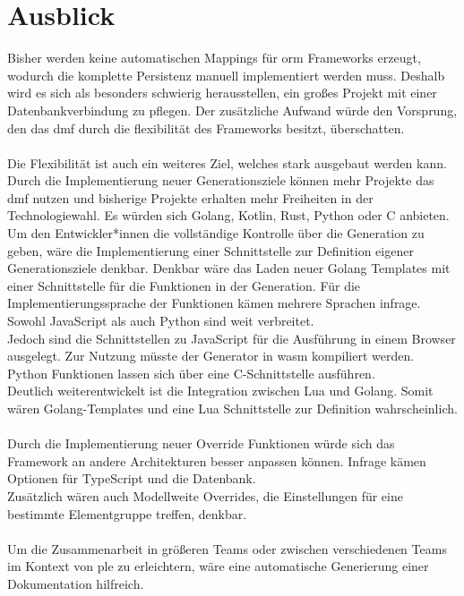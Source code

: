 \documentclass[./einleitung.tex]{subfiles}
\begin{document}
\section{Ausblick}\label{sec:ausblick}
Bisher werden keine automatischen Mappings für \acrshort{orm} Frameworks erzeugt, wodurch die komplette Persistenz manuell implementiert werden muss.
    Deshalb wird es sich als besonders schwierig herausstellen, ein großes Projekt mit einer Datenbankverbindung zu pflegen.
    Der zusätzliche Aufwand würde den Vorsprung, den das \acrshort{dmf} durch die flexibilität des Frameworks besitzt, überschatten.
    \\\\
    Die Flexibilität ist auch ein weiteres Ziel, welches stark ausgebaut werden kann.
    Durch die Implementierung neuer Generationsziele können mehr Projekte das \acrshort{dmf} nutzen und bisherige Projekte erhalten mehr Freiheiten in der Technologiewahl.
    Es würden sich Golang, Kotlin, Rust, Python oder C anbieten.\\
    Um den Entwickler*innen die vollständige Kontrolle über die Generation zu geben, wäre die Implementierung einer Schnittstelle zur Definition eigener Generationsziele denkbar.
    Denkbar wäre das Laden neuer Golang Templates mit einer Schnittstelle für die Funktionen in der Generation.
    Für die Implementierungssprache der Funktionen kämen mehrere Sprachen infrage.
    Sowohl JavaScript als auch Python sind weit verbreitet.\\
    Jedoch sind die Schnittstellen zu JavaScript für die Ausführung in einem Browser ausgelegt.
    Zur Nutzung müsste der Generator in \acrfull{wasm} kompiliert werden.\\
    Python Funktionen lassen sich über eine C-Schnittstelle ausführen.\\
    Deutlich weiterentwickelt ist die Integration zwischen Lua und Golang.
    Somit wären Golang-Templates und eine Lua Schnittstelle zur Definition wahrscheinlich.
    \\\\
    Durch die Implementierung neuer Override Funktionen würde sich das Framework an andere Architekturen besser anpassen können.
    Infrage kämen Optionen für TypeScript und die Datenbank.\\
    Zusätzlich wären auch Modellweite Overrides, die Einstellungen für eine bestimmte Elementgruppe treffen, denkbar.
    \\\\
    Um die Zusammenarbeit in größeren Teams oder zwischen verschiedenen Teams im Kontext von \acrshort{ple} zu erleichtern, wäre eine automatische Generierung einer Dokumentation hilfreich.
\end{document}
